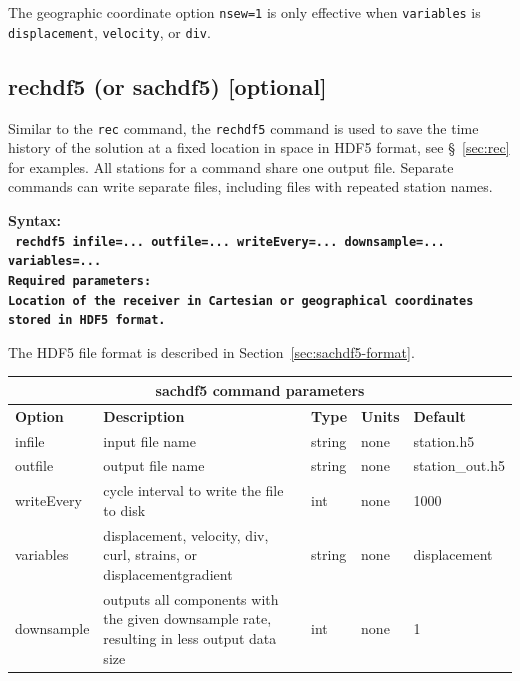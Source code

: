 \documentclass[11pt]{report}
\begin{document}
The geographic coordinate option {\tt nsew=1} is only effective when {\tt variables} is
{\tt displacement}, {\tt velocity}, or {\tt div}.



\subsection{rechdf5 (or sachdf5) [optional]}
Similar to the \verb+rec+ command, the \verb+rechdf5+ command is used to save the time history of the solution at a fixed location in
space in HDF5 format, see \S~\ref{sec:rec} for examples. All stations for a command share one output file. Separate commands can
write separate files, including files with repeated station names.
\begin{flushleft}
\bf
Syntax:\\
\tt
rechdf5 infile=... outfile=... writeEvery=... downsample=... variables=...
\\
\bf Required parameters:\\
\rm Location of the receiver in Cartesian or geographical coordinates stored in HDF5 format.
\end{flushleft}
%
The HDF5 file format is described in Section~\ref{sec:sachdf5-format}.
%

\begin{center}
\begin{tabular}{|l|p{8cm}|l|l|l|} \hline
\multicolumn{5}{|c|}{\bf sachdf5 command parameters}\\ \hline
\bf{Option} & \bf{Description} & \bf{Type} & \bf{Units} & \bf{Default} \\ \hline \hline
infile & input file name  & string & none & station.h5 \\ \hline
outfile & output file name  & string & none & station\_out.h5 \\ \hline
writeEvery & cycle interval to write the file to disk & int & none & 1000 \\ \hline
%
\hline
variables & displacement, velocity, div, curl, strains, or displacementgradient & string & none & displacement \\ \hline
downsample & outputs all components with the given downsample rate, resulting in less output data size & int & none & 1\\ \hline
\end{tabular}
\end{center}
\end{document}
